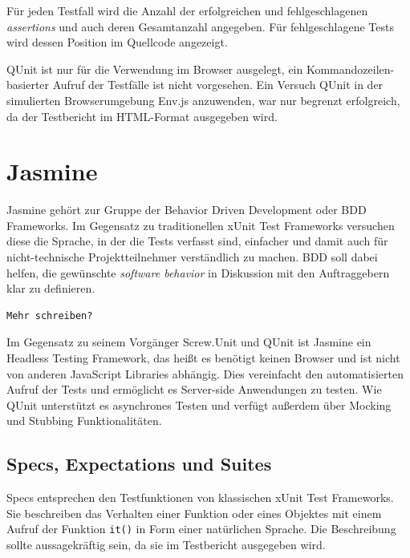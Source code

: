 \documentclass[11pt, a4paper]{article}
\begin{document}
Für jeden Testfall wird die Anzahl der erfolgreichen und fehlgeschlagenen
\emph{assertions} und auch deren Gesamtanzahl angegeben. Für fehlgeschlagene
Tests wird dessen Position im Quellcode angezeigt.

QUnit ist nur für die Verwendung im Browser ausgelegt, ein
Kommandozeilen-basierter Aufruf der Testfälle ist nicht vorgesehen. Ein
Versuch\cite{plee_qunit_2010} QUnit in der simulierten Browserumgebung
Env.js\cite{resig_envjs_2011} anzuwenden, war nur begrenzt erfolgreich, da der
Testbericht im HTML-Format ausgegeben wird.

\section{Jasmine}

Jasmine\cite{jasmine_jasmine_2011} gehört zur Gruppe der Behavior Driven
Development\cite{wikipedia_behavior_2011} oder BDD Frameworks. Im Gegensatz zu
traditionellen xUnit Test Frameworks versuchen diese die Sprache, in der die
Tests verfasst sind, einfacher und damit auch für nicht-technische
Projektteilnehmer verständlich zu machen. BDD soll dabei helfen, die gewünschte
\emph{software behavior} in Diskussion mit den Auftraggebern klar zu definieren.

\begin{verbatim}
Mehr schreiben?
\end{verbatim}

Im Gegensatz zu seinem Vorgänger Screw.Unit\cite{sobo_screw.unit_2011} und QUnit
ist Jasmine ein Headless Testing Framework, das heißt es benötigt keinen
Browser und ist nicht von anderen JavaScript Libraries abhängig. Dies
vereinfacht den automatisierten Aufruf der Tests und ermöglicht es Server-side
Anwendungen zu testen. Wie QUnit unterstützt es asynchrones Testen und verfügt
außerdem über Mocking und Stubbing Funktionalitäten.

\subsection{Specs, Expectations und Suites}

Specs entsprechen den Testfunktionen von klassischen xUnit Test Frameworks. Sie
beschreiben das Verhalten einer Funktion oder eines Objektes mit einem Aufruf
der Funktion \texttt{it()} in Form einer natürlichen Sprache. Die Beschreibung
sollte aussagekräftig sein, da sie im Testbericht ausgegeben wird.
\end{document}
